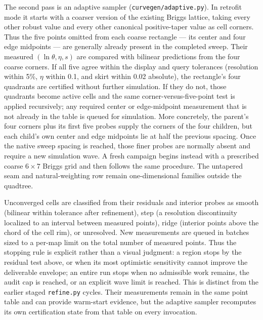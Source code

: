 \documentclass[11pt]{article}
\begin{document}
The second pass is an adaptive sampler (\texttt{curvegen/adaptive.py}).
In retrofit mode it starts with a coarser version of the existing Briggs
lattice, taking every other robust value and every other canonical
positive-taper value as cell corners.  Thus the five points omitted from each
coarse rectangle --- its center and four edge midpoints --- are generally
already present in the completed sweep.  Their measured $(\ln\theta,\eta,s)$
are compared with bilinear predictions from the four coarse corners.  If all
five agree within the display and query tolerances (resolution within 5\%,
$\eta$ within 0.1, and skirt within 0.02 absolute), the rectangle's four
quadrants are certified without further simulation.  If they do not, those
quadrants become active cells and the same corner-versus-five-point test is
applied recursively; any required center or edge-midpoint measurement that is
not already in the table is queued for simulation.  More concretely, the
parent's four corners plus its first five probes supply the corners of the four
children, but each child's own center and edge midpoints lie at half the
previous spacing.  Once the native sweep spacing is reached, those finer
probes are normally absent and require a new simulation wave.  A fresh
campaign begins instead with a prescribed coarse $6\times7$ Briggs grid and
then follows the same procedure.  The untapered seam and natural-weighting row
remain one-dimensional families outside the quadtree.

Unconverged cells are classified from their residuals and interior probes as
smooth (bilinear within tolerance after refinement), step (a resolution
discontinuity localized to an interval between measured points), ridge
(interior points above the chord of the cell rim), or unresolved.  New
measurements are queued in batches sized to a per-map limit on the total
number of measured points.  Thus the stopping rule is explicit rather than a
visual judgment: a region stops by the residual test above, or when its most
optimistic sensitivity cannot improve the deliverable envelope; an entire run
stops when no admissible work remains, the audit cap is reached, or an explicit
wave limit is reached.  This is distinct from the earlier staged
\texttt{refine.py} cycles.  Their measurements remain in the same point table
and can provide warm-start evidence, but the adaptive sampler recomputes its
own certification state from that table on every invocation.
\end{document}
